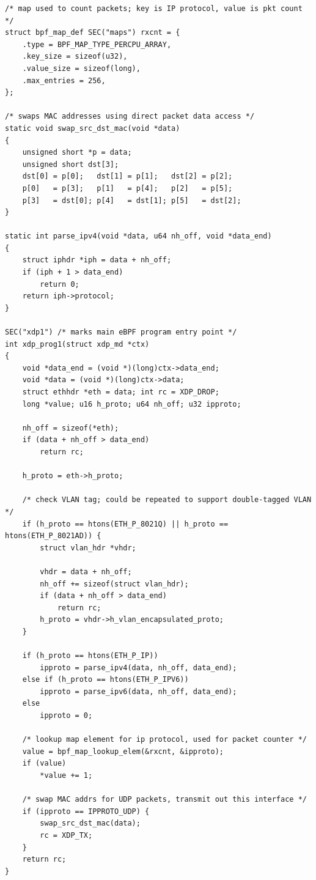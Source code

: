 \documentclass[sigconf]{acmart}
\begin{document}
\begin{listing}
  \caption{\label{lst:ex-xdp-prog}Example XDP program. The program parses packet
    headers, swaps source and destination MAC addresses for all UDP packets, and
    sends them back out the same interface. A packet counter is kept per IP
    protocol number. Adapted from xdp2\_kern.c, which is distributed with the
    kernel source code.}
\begin{verbatim}
/* map used to count packets; key is IP protocol, value is pkt count */
struct bpf_map_def SEC("maps") rxcnt = {
	.type = BPF_MAP_TYPE_PERCPU_ARRAY,
	.key_size = sizeof(u32),
	.value_size = sizeof(long),
	.max_entries = 256,
};

/* swaps MAC addresses using direct packet data access */
static void swap_src_dst_mac(void *data)
{
	unsigned short *p = data;
	unsigned short dst[3];
	dst[0] = p[0];   dst[1] = p[1];   dst[2] = p[2];
	p[0]   = p[3];   p[1]   = p[4];   p[2]   = p[5];
	p[3]   = dst[0]; p[4]   = dst[1]; p[5]   = dst[2];
}

static int parse_ipv4(void *data, u64 nh_off, void *data_end)
{
	struct iphdr *iph = data + nh_off;
	if (iph + 1 > data_end)
		return 0;
	return iph->protocol;
}

SEC("xdp1") /* marks main eBPF program entry point */
int xdp_prog1(struct xdp_md *ctx)
{
	void *data_end = (void *)(long)ctx->data_end;
	void *data = (void *)(long)ctx->data;
	struct ethhdr *eth = data; int rc = XDP_DROP;
	long *value; u16 h_proto; u64 nh_off; u32 ipproto;

	nh_off = sizeof(*eth);
	if (data + nh_off > data_end)
		return rc;

	h_proto = eth->h_proto;

	/* check VLAN tag; could be repeated to support double-tagged VLAN */
	if (h_proto == htons(ETH_P_8021Q) || h_proto == htons(ETH_P_8021AD)) {
		struct vlan_hdr *vhdr;

		vhdr = data + nh_off;
		nh_off += sizeof(struct vlan_hdr);
		if (data + nh_off > data_end)
			return rc;
		h_proto = vhdr->h_vlan_encapsulated_proto;
	}

	if (h_proto == htons(ETH_P_IP))
		ipproto = parse_ipv4(data, nh_off, data_end);
	else if (h_proto == htons(ETH_P_IPV6))
		ipproto = parse_ipv6(data, nh_off, data_end);
	else
		ipproto = 0;

	/* lookup map element for ip protocol, used for packet counter */
	value = bpf_map_lookup_elem(&rxcnt, &ipproto);
	if (value)
		*value += 1;

	/* swap MAC addrs for UDP packets, transmit out this interface */
	if (ipproto == IPPROTO_UDP) {
		swap_src_dst_mac(data);
		rc = XDP_TX;
	}
	return rc;
}

\end{verbatim}
\end{listing}
\end{document}
